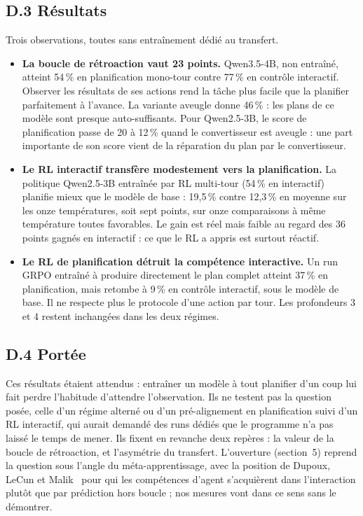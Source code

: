 \documentclass[11pt,a4paper]{article}
\begin{document}
\subsection*{D.3 Résultats}
Trois observations, toutes sans entraînement dédié au transfert.

\begin{itemize}
    \item \textbf{La boucle de rétroaction vaut 23 points.} Qwen3.5-4B, non entraîné, atteint 54\,\% en planification mono-tour contre 77\,\% en contrôle interactif. Observer les résultats de ses actions rend la tâche plus facile que la planifier parfaitement à l'avance. La variante aveugle donne 46\,\% : les plans de ce modèle sont presque auto-suffisants. Pour Qwen2.5-3B, le score de planification passe de 20 à 12\,\% quand le convertisseur est aveugle : une part importante de son score vient de la réparation du plan par le convertisseur.
    \item \textbf{Le RL interactif transfère modestement vers la planification.} La politique Qwen2.5-3B entraînée par RL multi-tour (54\,\% en interactif) planifie mieux que le modèle de base : 19{,}5\,\% contre 12{,}3\,\% en moyenne sur les onze températures, soit sept points, sur onze comparaisons à même température toutes favorables. Le gain est réel mais faible au regard des 36 points gagnés en interactif : ce que le RL a appris est surtout réactif.
    \item \textbf{Le RL de planification détruit la compétence interactive.} Un run GRPO entraîné à produire directement le plan complet atteint 37\,\% en planification, mais retombe à 9\,\% en contrôle interactif, sous le modèle de base. Il ne respecte plus le protocole d'une action par tour. Les profondeurs 3 et 4 restent inchangées dans les deux régimes.
\end{itemize}

\subsection*{D.4 Portée}
Ces résultats étaient attendus : entraîner un modèle à tout planifier d'un coup lui fait perdre l'habitude d'attendre l'observation. Ils ne testent pas la question posée, celle d'un régime alterné ou d'un pré-alignement en planification suivi d'un RL interactif, qui aurait demandé des runs dédiés que le programme n'a pas laissé le temps de mener. Ils fixent en revanche deux repères : la valeur de la boucle de rétroaction, et l'asymétrie du transfert. L'ouverture (section~5) reprend la question sous l'angle du méta-apprentissage, avec la position de Dupoux, LeCun et Malik~\cite{dupoux2026why} pour qui les compétences d'agent s'acquièrent dans l'interaction plutôt que par prédiction hors boucle ; nos mesures vont dans ce sens sans le démontrer.
\end{document}
